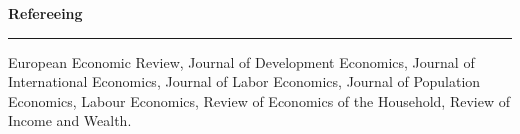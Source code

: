 \documentclass[12pt]{article}
\newcommand{\NewPart}[1]{ \vspace*{0.4cm} \noindent \large \textbf{#1}
\par \normalsize \normalfont \vspace*{-0.5cm} \noindent\rule{\textwidth}{1.8pt} \vspace*{-0.75cm} }
\newcommand{\ConferenceEntry}[2]{
		\noindent
		#1		   %
		\hspace{0em} #2 \par}     %
\newcommand{\EducationEntry}[4]{
		\noindent #1 \hfill      %
		\noindent #2 %
		\par  %
		\noindent \textit{#3} \par        %
		\noindent\hangindent=2em\hangafter=0  #4 %
		\normalsize \par}
\begin{document}
%
%
%


\vspace*{-0.25cm}
\NewPart{Refereeing}{}

\ConferenceEntry{European Economic Review, Journal of Development Economics, Journal of International Economics, Journal of Labor Economics, Journal of Population Economics, Labour Economics, Review of Economics of the Household, Review of Income and Wealth.}{}

















\end{document}
